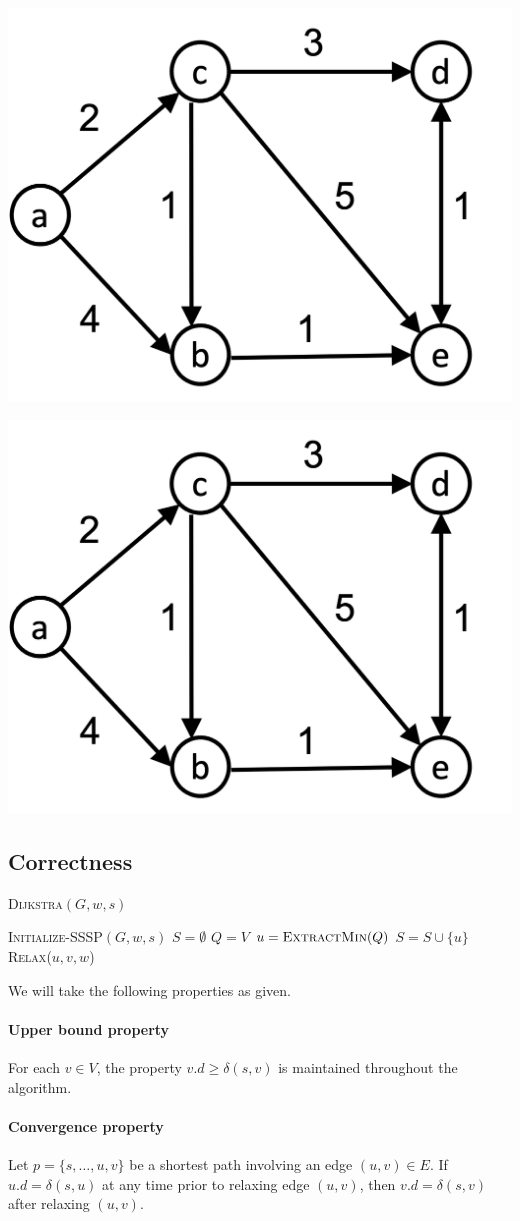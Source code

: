 \documentclass[11  pt]{exam}
\begin{document}
	\includegraphics[width = .45\linewidth]{small-graph-sssp.png}
	
	\includegraphics[width = .45\linewidth]{small-graph-sssp.png}
	\newpage
	\subsection{Correctness}
	\vspace{-20pt}
	\begin{algorithm}
		\textsc{Dijkstra}$(G,w,s)$
		\begin{algorithmic}
			\State \textsc{Initialize-SSSP}$(G,w,s)$
			\State $S = \emptyset$
			\State $Q = V$
			\State $u = \textsc{ExtractMin}(Q)$
			\State $S = S \cup \{u\}$
			\State \textsc{Relax}($u,v,w$)
			\EndFor
			\EndWhile
		\end{algorithmic}
	\end{algorithm}
	We will take the following properties as given.
	
	\paragraph{Upper bound property}
	For each $v \in V$, the property $v.d \geq \delta(s,v)$ is maintained throughout the algorithm.\\
	
	\paragraph{Convergence property}
	Let $p = \{s, \hdots , u,v\}$ be a shortest path involving an edge $(u,v) \in E$. If $u.d = \delta(s,u)$ at any time prior to relaxing edge $(u,v)$, then $v.d = \delta(s,v)$ after relaxing $(u,v)$.\\
	
\end{document}
